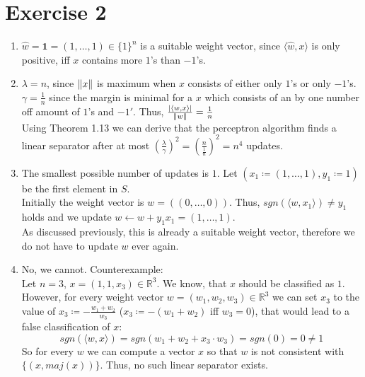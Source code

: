 \documentclass[12pt]{article}
\DeclarePairedDelimiter\abs{\lvert}{\rvert}
\DeclarePairedDelimiter\Abs{\lVert}{\rVert}
\begin{document}
\section*{Exercise 2}
\begin{enumerate}[label=(\alph*)]
	\item	$\hat{w}=\textbf{1}=(1, \dots, 1) \in \{1\}^n$ is a suitable weight vector, since $\langle \hat{w},x \rangle$ is only positive, iff $x$ contains more $1$'s than $-1$'s.
	\item	$\lambda = n$, since $\Abs{x}$ is maximum when $x$ consists of either only $1$'s or only $-1$'s. \\
			$\gamma = \frac{1}{n}$ since the margin is minimal for a $x$ which consists of an by one number off amount of $1$'s and $-1'$. Thus, $\frac{\abs{\langle w,x \rangle}}{\Abs{w}} = \frac{1}{n}$ \\
			Using Theorem 1.13 we can derive that the perceptron algorithm finds a linear separator after at most $\left(\frac{\lambda}{\gamma}\right)^2 = \left( \frac{n}{\frac{1}{n}}\right)^2 = n^4$ updates.
	\item	The smallest possible number of updates is $1$. Let $(x_1 \coloneqq (1, \dots, 1), y_1 \coloneqq 1)$ be the first element in $S$. \\
			Initially the weight vector is $w=((0, \dots, 0))$. Thus, $sgn(\langle w, x_1 \rangle) \neq y_1$ holds and we update $w \leftarrow w + y_1 x_1 = (1, \dots, 1)$. \\
			As discussed previously, this is already a suitable weight vector, therefore we do not have to update $w$ ever again.
	\item	No, we cannot. Counterexample: \\
			Let $n=3$, $x=(1,1,x_3) \in \mathbb{R}^3$. We know, that $x$ should be classified as $1$. However, for every weight vector $w = (w_1, w_2, w_3) \in \mathbb{R}^3$ we can set $x_3$ to the value of $x_3 \coloneqq -\frac{w_1 + w_2}{w_3}$ ($x_3 \coloneqq -(w_1 + w_2)$ iff $w_3 = 0$), that would lead to a false classification of $x$:
			$$sgn(\langle w,x \rangle) = sgn(w_1 + w_2 + x_3 \cdot w_3) = sgn(0) = 0 \neq 1$$
			So for every $w$ we can compute a vector $x$ so that $w$ is not consistent with $\{(x, maj(x))\}$. Thus, no such linear separator exists.
\end{enumerate}
\end{document}
